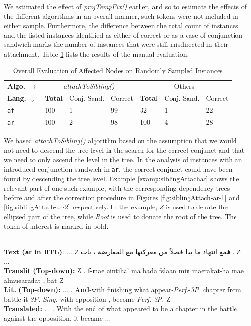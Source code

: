 We estimated the effect of \textit{projTempFix()} earlier, and so to estimate the effects of the different algorithms in an overall manner, such tokens were not included in either sample. Furthermore, the difference between the total count of instances and the listed instances identified as either of correct or as a case of conjunction sandwich marks the number of instances that were still misdirected in their attachment. Table \ref{tab:evalOverall} lists the results of the manual evaluation.

\begin{table}[H]
    \centering
    \begin{tabular}{|l|l|l|l|l|l|l|}
    \hline
    \multicolumn{1}{|l|}{\textbf{Algo.} $\rightarrow$} &
    \multicolumn{3}{c|}{\textit{attachToSibling()}} &
    \multicolumn{3}{c|}{Others}\\
    \textbf{Lang. $\downarrow$} & \textbf{Total} & Conj. Sand. & Correct & \textbf{Total} & Conj. Sand. & Correct\\
    \hline
    \texttt{af} & 100 & 1 & 99 & 32 & 1 & 22\\
    \texttt{ar} & 100 & 2 & 98 & 100 & 4 & 28\\
    \hline
    \end{tabular}
    \caption{Overall Evaluation of Affected Nodes on Randomly Sampled Instances}
    \label{tab:evalOverall}
\end{table}

We based \textit{attachToSibling()} algorithm based on the assumption that we would not need to descend the tree level in the search for the correct conjunct and that we need to only ascend the level in the tree. In the analysis of instances with an introduced conjunction sandwich in \verb|ar|, the correct conjunct could have been found by descending the tree level. Example \ref{examp:siblingAttachar} shows the relevant part of one such example, with the corresponding dependency trees before and after the correction procedure in Figures \ref{fig:siblingAttach-ar-1} and \ref{fig:siblingAttach-ar-2} respectively. In the example, \textit{Z} is used to denote the ellipsed part of the tree, while \textit{Root} is used to donate the root of the tree. The token of interest is marked in bold.

\begin{example}
\label{examp:siblingAttachar}
\textbf{ }\\
\textbf{Text (\texttt{ar} in RTL):} ... Z \textarabic{
\textbf{ف}مع  انتهاء   ما بدا فصلاً من معركتها مع المعارضة ، بات }
. Z ...\\
\textbf{Translit (Top-down):} Z . \textbf{f}-mae aintiha' ma bada fslaan min maerakat-ha mae almuearadat , bat Z\\
\textbf{Lit. (Top-down):} ... . \textbf{And}-with finishing what appear-\textit{Perf.}-\textit{3P.} chapter from battle-it-\textit{3P.}-\textit{Sing.} with opposition , become-\textit{Perf.}-\textit{3P.} Z\\
\textbf{Translated:} ... . With the end of what appeared to be a chapter in the battle against the opposition, it became ...  
\end{example}

